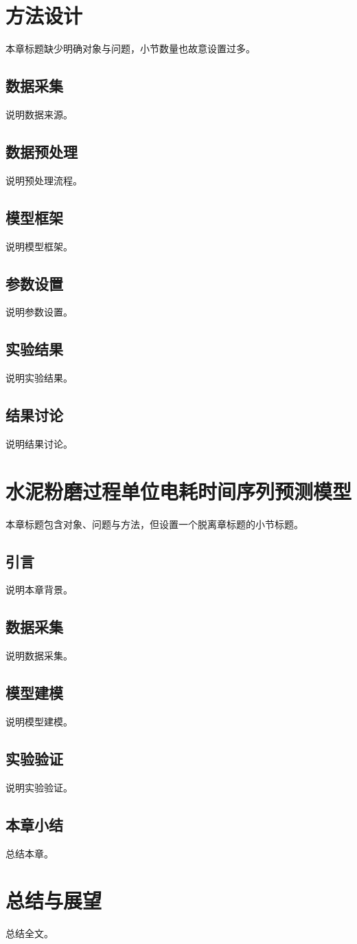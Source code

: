 \documentclass{ctexbook}
\begin{document}
\chapter{方法设计}
本章标题缺少明确对象与问题，小节数量也故意设置过多。

\section{数据采集}
说明数据来源。

\section{数据预处理}
说明预处理流程。

\section{模型框架}
说明模型框架。

\section{参数设置}
说明参数设置。

\section{实验结果}
说明实验结果。

\section{结果讨论}
说明结果讨论。

\chapter{水泥粉磨过程单位电耗时间序列预测模型}
本章标题包含对象、问题与方法，但设置一个脱离章标题的小节标题。

\section{引言}
说明本章背景。

\section{数据采集}
说明数据采集。

\section{模型建模}
说明模型建模。

\section{实验验证}
说明实验验证。

\section{本章小结}
总结本章。

\chapter{总结与展望}
总结全文。
\end{document}
